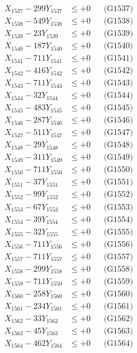 \documentclass[a4paper,10pt]{article}
\begin{document}
{\begin{align}
X_{1537} - 299Y_{1537} &\leq +0 && \text{(G1537)} \\
X_{1538} - 549Y_{1538} &\leq +0 && \text{(G1538)} \\
X_{1539} - 23Y_{1539} &\leq +0 && \text{(G1539)} \\
X_{1540} - 187Y_{1540} &\leq +0 && \text{(G1540)} \\
\allowbreak
X_{1541} - 711Y_{1541} &\leq +0 && \text{(G1541)} \\
X_{1542} - 416Y_{1542} &\leq +0 && \text{(G1542)} \\
X_{1543} - 711Y_{1543} &\leq +0 && \text{(G1543)} \\
X_{1544} - 32Y_{1544} &\leq +0 && \text{(G1544)} \\
X_{1545} - 483Y_{1545} &\leq +0 && \text{(G1545)} \\
X_{1546} - 287Y_{1546} &\leq +0 && \text{(G1546)} \\
X_{1547} - 511Y_{1547} &\leq +0 && \text{(G1547)} \\
X_{1548} - 29Y_{1548} &\leq +0 && \text{(G1548)} \\
X_{1549} - 311Y_{1549} &\leq +0 && \text{(G1549)} \\
X_{1550} - 711Y_{1550} &\leq +0 && \text{(G1550)} \\
\allowbreak
X_{1551} - 37Y_{1551} &\leq +0 && \text{(G1551)} \\
X_{1552} - 99Y_{1552} &\leq +0 && \text{(G1552)} \\
X_{1553} - 67Y_{1553} &\leq +0 && \text{(G1553)} \\
X_{1554} - 39Y_{1554} &\leq +0 && \text{(G1554)} \\
X_{1555} - 32Y_{1555} &\leq +0 && \text{(G1555)} \\
X_{1556} - 711Y_{1556} &\leq +0 && \text{(G1556)} \\
X_{1557} - 711Y_{1557} &\leq +0 && \text{(G1557)} \\
X_{1558} - 299Y_{1558} &\leq +0 && \text{(G1558)} \\
X_{1559} - 711Y_{1559} &\leq +0 && \text{(G1559)} \\
X_{1560} - 258Y_{1560} &\leq +0 && \text{(G1560)} \\
\allowbreak
X_{1561} - 234Y_{1561} &\leq +0 && \text{(G1561)} \\
X_{1562} - 33Y_{1562} &\leq +0 && \text{(G1562)} \\
X_{1563} - 45Y_{1563} &\leq +0 && \text{(G1563)} \\
X_{1564} - 462Y_{1564} &\leq +0 && \text{(G1564)} \\

\end{align}}
\end{document}
